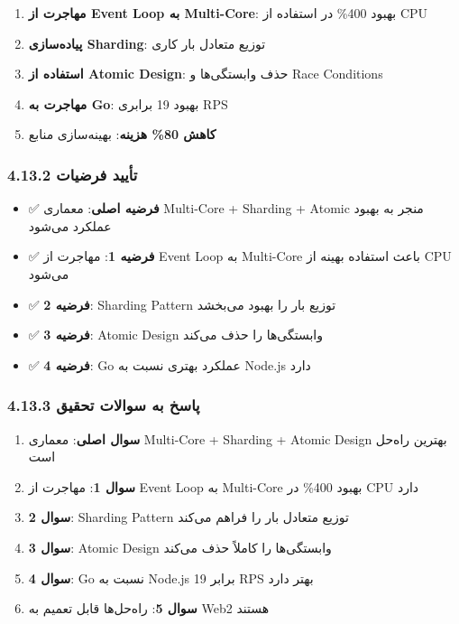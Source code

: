 \documentclass[
]{article}
\providecommand{\tightlist}{%
  \setlength{\itemsep}{0pt}\setlength{\parskip}{0pt}}
\begin{document}
\begin{enumerate}
\def\labelenumi{\arabic{enumi}.}
\tightlist
\item
  \textbf{مهاجرت از Event Loop به Multi-Core}: بهبود 400\% در استفاده از
  CPU
\item
  \textbf{پیاده‌سازی Sharding}: توزیع متعادل بار کاری
\item
  \textbf{استفاده از Atomic Design}: حذف وابستگی‌ها و Race Conditions
\item
  \textbf{مهاجرت به Go}: بهبود 19 برابری RPS
\item
  \textbf{کاهش 80\% هزینه}: بهینه‌سازی منابع
\end{enumerate}

\subsubsection{4.13.2 تأیید
فرضیات}\label{ux62aux623ux6ccux6ccux62f-ux641ux631ux636ux6ccux627ux62a}

\begin{itemize}
\tightlist
\item
  ✅ \textbf{فرضیه اصلی}: معماری Multi-Core + Sharding + Atomic منجر به
  بهبود عملکرد می‌شود
\item
  ✅ \textbf{فرضیه 1}: مهاجرت از Event Loop به Multi-Core باعث استفاده
  بهینه از CPU می‌شود
\item
  ✅ \textbf{فرضیه 2}: Sharding Pattern توزیع بار را بهبود می‌بخشد
\item
  ✅ \textbf{فرضیه 3}: Atomic Design وابستگی‌ها را حذف می‌کند
\item
  ✅ \textbf{فرضیه 4}: Go عملکرد بهتری نسبت به Node.js دارد
\end{itemize}

\subsubsection{4.13.3 پاسخ به سوالات
تحقیق}\label{ux67eux627ux633ux62e-ux628ux647-ux633ux648ux627ux644ux627ux62a-ux62aux62dux642ux6ccux642}

\begin{enumerate}
\def\labelenumi{\arabic{enumi}.}
\tightlist
\item
  \textbf{سوال اصلی}: معماری Multi-Core + Sharding + Atomic Design
  بهترین راه‌حل است
\item
  \textbf{سوال 1}: مهاجرت از Event Loop به Multi-Core بهبود 400\% در CPU
  دارد
\item
  \textbf{سوال 2}: Sharding Pattern توزیع متعادل بار را فراهم می‌کند
\item
  \textbf{سوال 3}: Atomic Design وابستگی‌ها را کاملاً حذف می‌کند
\item
  \textbf{سوال 4}: Go نسبت به Node.js 19 برابر RPS بهتر دارد
\item
  \textbf{سوال 5}: راه‌حل‌ها قابل تعمیم به Web2 هستند
\end{enumerate}
\end{document}
